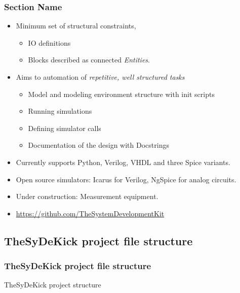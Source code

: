 \documentclass{sdkslides}
\newcommand{\sectname}{Section Name}
\begin{document}
\begin{frame}[t]
    \frametitle{\sectname}
    \begin{itemize}
        \item Minimum set of structural constraints, 
            \begin{itemize}
                \item IO definitions
                \item Blocks described as connected \emph{Entities}.
            \end{itemize}
        \item Aims to automation of \emph{repetitive, well structured tasks}
            \begin{itemize}
                \item Model and modeling environment structure with init scripts
                \item Running simulations
                \item Defining simulator calls
                \item Documentation of the design with Docstrings
            \end{itemize}
        \item Currently supports Python, Verilog, VHDL and three Spice
            variants.
        \item Open source simulators: Icarus for Verilog, NgSpice for analog
            circuits.
        \item Under construction: Measurement equipment.
        \item \url{https://github.com/TheSystemDevelopmentKit}
    \end{itemize}
\end{frame}

\renewcommand{\sectionname}{TheSyDeKick project file structure}
\subsection*{\sectionname}
\begin{frame}[t]
    \frametitle{\sectionname}
    \begin{block}{TheSyDeKick project structure}
    \begin{minipage}[t]{0.3\textwidth}
    \parbox{\textwidth}{
    }
    \end{minipage}
    \end{block}
\end{frame}
\end{document}
